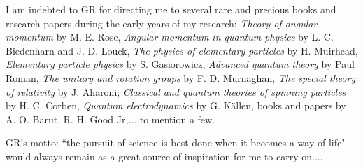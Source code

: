 I am indebted to GR for directing me to several rare and precious books and research papers during the early years of my research: \textit{Theory of angular momentum} by M. E. Rose, \textit{Angular momentum in quantum physics} by L. C. Biedenharn and J. D. Louck, \textit{The physics of elementary particles} by H. Muirhead, \textit{Elementary particle physics} by S. Gasiorowicz, \textit{Advanced quantum theory} by Paul Roman, \textit{The unitary and rotation groups} by F. D. Murnaghan, \textit{The special theory of relativity} by J. Aharoni; \textit{Classical and quantum theories of spinning particles} by H. C. Corben, \textit{Quantum electrodynamics} by G. K\"{a}llen, books and papers by A. O. Barut, R. H. Good Jr,... to mention a few.

GR's motto: ``the pursuit of science is best done when it becomes a way of life" would always remain as a great source of inspiration for me to carry on....
\vskip 0.5cm



